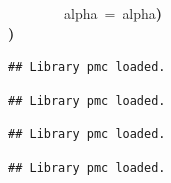 \documentclass{elsarticle}
\makeatletter
\newcommand{\hlkeyword}[1]{\textbf{#1}}%
\newcommand{\hlargument}[1]{\textcolor[rgb]{.69,.25,.02}{#1}}%
\newcommand{\hlsymbol}[1]{#1}%
\newcommand{\hlstd}[1]{\textcolor[rgb]{0,0,0}{#1}}%
\newenvironment{kframe}{%
 \def\FrameCommand##1{\hskip\@totalleftmargin \hskip-\fboxsep
 \colorbox{shadecolor}{##1}\hskip-\fboxsep
     \hskip-\linewidth \hskip-\@totalleftmargin \hskip\columnwidth}%
 \MakeFramed {\advance\hsize-\width
   \@totalleftmargin\z@ \linewidth\hsize
   \@setminipage}}%
 {\par\unskip\endMakeFramed}
\newenvironment{knitrout}{}{} %
\makeatother
\begin{document}
\begin{knitrout}
{\begin{kframe}
\begin{flushleft}
\hlstd{}{\ }{\ }{\ }{\ }{\ }{\ }{\ }{\ }\hlargument{alpha}{\ }\hlargument{=}{\ }\hlsymbol{alpha}\hlkeyword{)}\hspace*{\fill}\\
\hlstd{}\hlkeyword{\usebox{\hlnormalsizeboxclosebrace}}\hlkeyword{)}\mbox{}
\normalfont
\end{flushleft}
\begin{verbatim}
## Library pmc loaded.
\end{verbatim}
\begin{verbatim}
## Library pmc loaded.
\end{verbatim}
\begin{verbatim}
## Library pmc loaded.
\end{verbatim}
\begin{verbatim}
## Library pmc loaded.
\end{verbatim}
\end{kframe}}
\end{knitrout}
\end{document}
